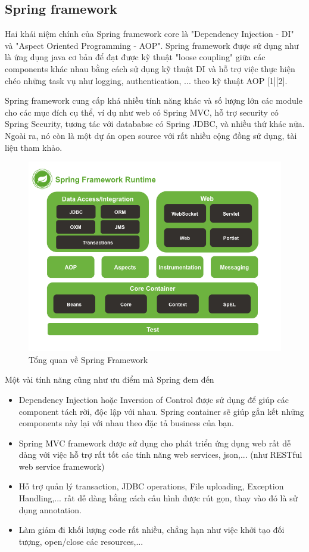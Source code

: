 \documentclass[11pt,a4paper,oneside]{book}
\begin{document}
\subsection{Spring framework}

Hai khái niệm chính của Spring framework core là "Dependency Injection - DI" và "Aspect Oriented Programming - AOP". Spring framework được sử dụng như là ứng dụng java cơ bản để đạt được kỹ thuật "loose coupling" giữa các components khác nhau bằng cách sử dụng kỹ thuật DI và hỗ trợ việc thực hiện chéo những task vụ như logging, authentication, ... theo kỹ thuật AOP [1][2].

Spring framework cung cấp khá nhiều tính năng khác và số lượng lớn các module cho các mục đích cụ thể, ví dụ như web có Spring MVC, hỗ trợ security có Spring Security, tương tác với datababse có Spring JDBC, và nhiều thứ khác nữa. Ngoài ra, nó còn là một dự án open source với rất nhiều cộng đồng sử dụng, tài liệu tham khảo.

\begin{figure}[h]
  \centering
     \includegraphics[width=12cm]{3-spring-framework-overview}
  \caption{Tổng quan về Spring Framework}\label{fig:3-spring-framework-overview}
\end{figure}

Một vài tính năng cũng như ưu điểm mà Spring đem đến

\begin{itemize}[topsep=1mm,itemsep=-0.5mm]
\item Dependency Injection hoặc Inversion of Control được sử dụng để giúp các component tách rời, độc lập với nhau. Spring container sẽ giúp gắn kết những components này lại với nhau theo đặc tả business của bạn.
\item Spring MVC framework được sử dụng cho phát triển ứng dụng web rất dễ dàng với việc hỗ trợ rất tốt các tính năng web services, json,... (như RESTful web service framework)
\item Hỗ trợ quản lý transaction, JDBC operations, File uploading, Exception Handling,... rất dễ dàng bằng cách cấu hình được rút gọn, thay vào đó là sử dụng annotation.
\item Làm giảm đi khối lượng code rất nhiều, chẳng hạn như việc khởi tạo đối tượng, open/close các resources,...
\vspace{1mm}
\end{itemize}
\end{document}
